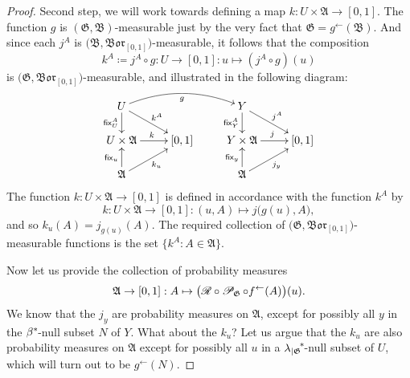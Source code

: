 \documentclass[
twoside=true,
paper=letter,
fontsize=9pt,
pagesize=auto,
leqno,
openany,
headsepline,
overfullrule,
]{scrbook}
\theoremstyle{plain}
\theoremstyle{plain}
\theoremstyle{definition}
\theoremstyle{bfnoteitalic}
\theoremstyle{bfnoteroman}
\newcommand{\sigalg}[1]{\mathfrak{#1}}
\newcommand{\cali}[1]{\mathscr{#1}}
\newcommand{\definedby}{\coloneqq}
\newcommand{\sfop}[1]{\mathsf{#1}}
\newcommand{\condprobop}[1]{\mathop{\cali{P}\hspace{-1pt}}\nolimits_{#1}}
\newcommand{\borel}{\mathfrak{Bor}}
\newcommand{\restrictedto}[1]{_{\lvert#1}\kern-1.5pt}
\newcommand{\preimage}[1]{#1^{\leftarrow}}
\newcommand{\sigmaalgebra}{\sigalg{A}}
\newcommand{\sigmaalgebraii}{\sigalg{B}}
\newcommand{\kernast}{\ast\kern-1pt}
\newcommand{\funcg}{g}
\newcommand{\funcj}{j}
\newcommand{\funck}{k}
\newcommand{\function}{f}
\newcommand{\measurespaceii}{Y}
\newcommand{\mspaceeltii}{y}
\newcommand{\measlambda}{\lambda}
\newcommand{\seti}{A}
\newcommand{\regular}{\cali{R}}
\newcommand{\fixinthefirst}[1]{\sfop{fix}_{#1}}
\newcommand{\fixinthesecond}[1]{\sfop{fix}^{#1}}
\newcommand{\uspace}{U}%
\newcommand{\uspaceelt}{u}
\newcommand{\marginaltwo}{\beta}%
\begin{document}
\begin{proof}
Second step, we will work towards defining a map
$\funck: \uspace\times \sigmaalgebra \to [0,1]$.
The function $\funcg$ is
$(\sigalg{G},\sigmaalgebraii)$\hyp{}measurable just by the very fact that
$\sigalg{G} = \preimage{\funcg}(\sigmaalgebraii)$. And since each
$\funcj^\seti$ is
$\bigl( \sigmaalgebraii, \borel_{[0,1]} \bigr)$\hyp{}measurable, it follows that the composition
\[
\funck^\seti\definedby\funcj^\seti\circ\funcg
: \uspace \to [0,1]
:\uspaceelt \mapsto (\funcj^\seti\circ\funcg)(\uspaceelt)
\]
is
$\bigl( \sigalg{G}, \borel_{[0,1]} \bigr)$\hyp{}measurable, and illustrated in the following diagram:
\[%
\xymatrix@R=16pt@C=24pt{
\uspace \ar[d]_-{\fixinthesecond{\seti}_\uspace} \ar@/^12pt/[rr]_{\funcg}
\ar[dr]^{\funck^\seti}
&
& \measurespaceii \ar[d]_-{\fixinthesecond{\seti}_\measurespaceii}
\ar[dr]^{\funcj^\seti}
&
\\
\uspace\times\sigmaalgebra \ar[r]^{\funck}
& [0,1]
& \measurespaceii\times\sigmaalgebra \ar[r]^{\funcj}
& [0,1]
\\
\sigmaalgebra \ar[u]^{\fixinthefirst{\uspaceelt}}
\ar[ur]_{\funck_\uspaceelt}
&
& \sigmaalgebra \ar[u]^{\fixinthefirst{\mspaceeltii}}
\ar[ur]_{\funcj_\mspaceeltii}
&
\\
}
\]
The function
$\funck: \uspace\times \sigmaalgebra \to [0,1]$
is defined in accordance with the function $\funck^\seti$ by
\[
\funck: \uspace\times \sigmaalgebra \to [0,1] :
(\uspaceelt,\seti) \mapsto \funcj\bigl(\funcg(\uspaceelt),\seti\bigr),
\]
and so
$\funck_\uspaceelt(\seti)=\funcj_{\funcg(\uspaceelt)}(\seti)$.
The required collection of $\bigl( \sigalg{G}, \borel_{[0,1]} \bigr)$\hyp{}measurable
functions is the set $\{\funck^\seti : \seti\in\sigmaalgebra\}$.

Now let us provide the collection of probability measures
\[
\sigmaalgebra\to [0,1]: \seti \mapsto
\bigl( \regular\circ\condprobop{\sigalg{G}} \circ\preimage{\function}
(\seti)\bigr)(\uspaceelt).
\]
We know that the $\funcj_\mspaceeltii$ are probability measures on $\sigmaalgebra$, except for possibly all
$\mspaceeltii$ in the $\marginaltwo^\kernast$\hyp{}null subset $N$ of $\measurespaceii$.  What about the
$\funck_\uspaceelt$?  Let us argue that the $\funck_\uspaceelt$ are also probability measures on $\sigmaalgebra$ except for possibly all $\uspaceelt$ in a
${\measlambda\restrictedto{\sigalg{G}}}^\kernast$\hyp{}null subset of $\uspace$,
which will turn out to be $\preimage{\funcg}(N)$.


\end{proof}
\end{document}
